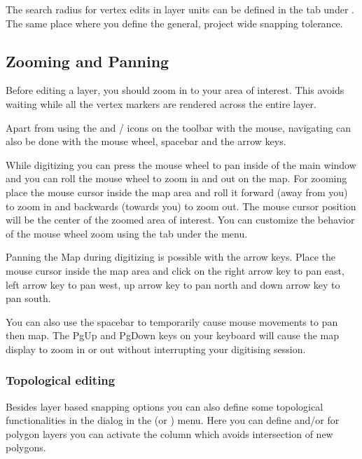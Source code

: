 The search radius for vertex edits in layer units can be defined in the
 tab under  \arrow
{}. The same place where you define the
general, project wide snapping tolerance.

\subsection{Zooming and Panning}

Before editing a layer, you should zoom in to your area of interest. This
avoids waiting while all the vertex markers are rendered across the entire
layer.

Apart from using the  and
/
icons on the toolbar with the mouse, navigating can also be done with the
mouse wheel, spacebar and the arrow keys.


While digitizing you can press the mouse wheel to pan inside of the main
window and you can roll the mouse wheel to zoom in and out on the map. For
zooming place the mouse cursor inside the map area and roll it forward (away
from you)
to zoom in and backwards (towards you) to zoom out. The mouse cursor position
will
be the center of the zoomed area of interest. You can customize the behavior
of the mouse wheel zoom using the  tab under the
 \arrow {} menu.


Panning the Map during digitizing is possible with the arrow keys. Place
the mouse cursor inside the map area and click on the right arrow key to
pan east, left arrow key to pan west, up arrow key to pan north and down
arrow key to pan south.

You can also use the spacebar to temporarily cause mouse movements to pan
then map. The PgUp and PgDown keys on your keyboard will cause the map
display to zoom in or out without interrupting your digitising session.

\subsubsection{Topological editing}

Besides layer based snapping options you can also define some topological 
functionalities in the  dialog in the 
 (or ) menu. Here you can define 
 and/or for polygon layers you can 
activate the column  which avoids intersection of new 
polygons.

